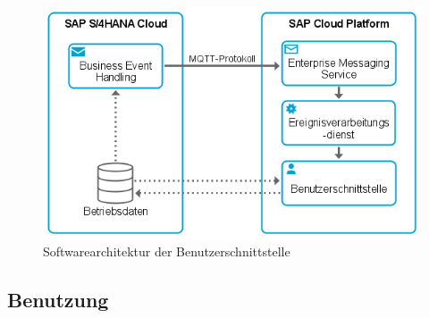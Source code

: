 \begin{figure}[H]
	\centering 
    \includegraphics[width=\textwidth]{img/frontntarch.png}	
    \caption[Softwarearchitektur der Benutzerschnittstelle]
    {Softwarearchitektur der Benutzerschnittstelle\protect\footnotemark}
    \label{fig:Softwarearchitektur der Benutzerschnittstelle}
\end{figure}

\subsection{Benutzung}

